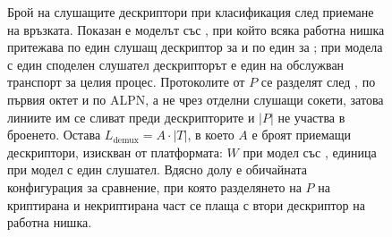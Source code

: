 \begin{figure}[htbp]
\caption{Брой на слушащите дескриптори при класификация след приемане на връзката. Показан е моделът със
, при който всяка работна нишка притежава по един слушащ дескриптор за
 и по един за ; при модела с един споделен слушател дескрипторът е един
на обслужван транспорт за целия процес.
Протоколите от $P$ се разделят след , по първия октет и по ALPN, а не чрез
отделни слушащи сокети, затова линиите им се сливат преди дескрипторите и $|P|$ не участва в
броенето. Остава $L_{\text{demux}} = A \cdot |T|$, в което $A$ е броят приемащи дескриптори,
изискван от платформата: $W$ при модел със , единица при модел с един
слушател. Вдясно долу е обичайната конфигурация за
сравнение, при която разделянето на $P$ на криптирана и некриптирана част се плаща с втори
дескриптор на работна нишка.}
\label{fig:descriptor_formula}
\end{figure}
